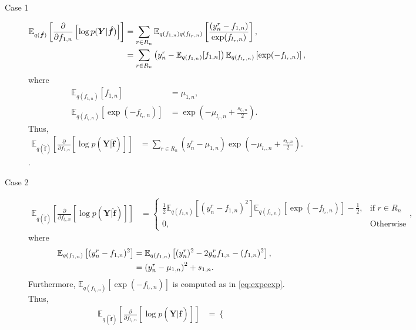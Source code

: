 \documentclass[9pt]{article}
\providecommand{\ve}[1]{{\bm{#1}}}%
\providecommand{\mat}[1]{{\bm{#1}}} %
\providecommand{\ve}[1]{{\mathbf{#1}}}
\providecommand{\mat}[1]{{\mathbf{#1}}}
\newcommand{\fracpartial}[2]{\frac{\partial #1}{\partial  #2}} %
\begin{document}
\begin{enumerate}
	\begin{description}
		\item[Case 1] 
		\begin{align}
		\notag \mathbb{E}_{q(\hat{\ve{f}})}\left[\fracpartial{}{f_{1,n}}\left[\log p(\mat{Y}|\hat{\ve{f}})\right]\right] &= \sum_{r\in R_n}\mathbb{E}_{q(f_{1,n})q(f_{l_r,n})}\left[\frac{(y_n^r - f_{1,n})}{\exp(f_{l_r,n})}\right],\\
		&= \sum_{r\in R_n} \left(y_n^r - \mathbb{E}_{q(f_{1,n})}[f_{1,n}]\right)\mathbb{E}_{q(f_{l_r,n})}\left[\exp(-f_{l_r,n})\right],
		\end{align}
		where 
		\begin{align}
		\mathbb{E}_{q(f_{1,n})}[f_{1,n}] &= \mu_{1,n},\\
		\label{eq:expcexp}
		\mathbb{E}_{q(f_{l_r,n})}\left[\exp(-f_{l_r,n})\right] &= \exp\left(-\mu_{l_r,n} + \frac{s_{l_r,n}}{2} \right).
		\end{align}
		Thus, 
		\begin{align}
		\mathbb{E}_{q(\hat{\ve{f}})}\left[\fracpartial{}{f_{1,n}}\left[\log p(\mat{Y}|\hat{\ve{f}})\right]\right] &= \sum_{r\in R_n} \left(y_n^r - \mu_{1,n}\right)\exp\left(-\mu_{l_r,n} + \frac{s_{l_r,n}}{2} \right).
		\end{align}.
		\item[Case 2] 
		\begin{align}
		 \mathbb{E}_{q(\hat{\ve{f}})}\left[\fracpartial{}{f_{l_r,n}}\left[\log p(\mat{Y}|\hat{\ve{f}})\right]\right] &= \begin{cases}
		\frac{1}{2}\mathbb{E}_{q(f_{1,n})}\left[(y_n^r - f_{1,n})^2\right]\mathbb{E}_{q(f_{l_r,n})}\left[\exp(-f_{l_r,n})\right]-\frac{1}{2}, & \mbox{if $r\in R_n$}\\
		 0, & \mbox{Otherwise}
		\end{cases},
		\end{align}
		where 
		\begin{align}
		\notag\mathbb{E}_{q(f_{1,n})}\left[(y_n^r - f_{1,n})^2\right] &= \mathbb{E}_{q(f_{1,n})}\left[(y_n^r)^2 - 2y_n^rf_{1,n} - (f_{1,n})^2\right],\\
		&= \left(y_n^r - \mu_{1,n}\right)^2 + s_{1,n}.
		\end{align}
		Furthermore, $\mathbb{E}_{q(f_{l_r,n})}\left[\exp(-f_{l_r,n})\right]$ is computed as in \cref{eq:expcexp}. Thus,
		\begin{align}
		 \mathbb{E}_{q(\hat{\ve{f}})}\left[\fracpartial{}{f_{l_r,n}}\left[\log p(\mat{Y}|\hat{\ve{f}})\right]\right] &= \begin{cases}

\end{cases}
\end{align}
\end{description}
\end{enumerate}
\end{document}
